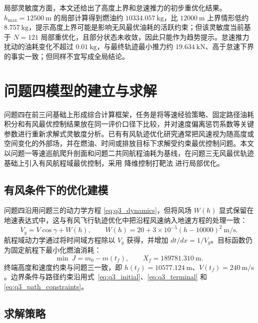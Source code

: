 \documentclass[withoutpreface,bwprint]{cumcmthesis}
\begin{document}
局部灵敏度方面，本文还给出了高度上界和怠速推力的初步重优化结果。$h_{\max}=12500\ \mathrm{m}$ 的局部计算得到燃油约 $10334.057\ \mathrm{kg}$，比 $12000\ \mathrm{m}$ 上界情形低约 $8.757\ \mathrm{kg}$，提示高度上界可能是影响无风最优油耗的活跃约束；但该灵敏度当前基于 $N=121$ 局部重优化，且部分状态未收敛，因此只能作为趋势提示。怠速推力扰动的油耗变化不超过 $0.01\ \mathrm{kg}$，与最终轨迹最小推力约 $19.634\ \mathrm{kN}$、高于怠速下界的事实一致；但同样不宜写成全局结论。

\section{问题四模型的建立与求解}

问题四在前三问基础上形成综合计算框架，任务是将等速经验策略、固定路径油耗积分和有风最优控制结果放在同一评价口径下比较，并对速度偏离惩罚系数等关键参数进行重新求解式灵敏度分析。已有有风轨迹优化研究通常把风速视为随高度或空间变化的外部场，并在燃油、时间或排放目标下求解受约束最优控制问题\cite{chang2023,jia2024}。本文以问题一等速巡航爬升剖面和问题二共同航程油耗为基线，在问题三无风最优轨迹基础上引入有风航程域最优控制，采用 降维控制打靶法 进行局部优化。

\subsection{有风条件下的优化建模}

问题四沿用问题三的动力学方程 \eqref{eq:q3_dynamics}，但将风场 $W(h)$ 显式保留在地速表达式中，这与有风飞行轨迹优化中把沿程风速纳入地速方程的处理一致\cite{chang2023,jia2024}：
\begin{equation}
V_g=V\cos\gamma+W(h),\qquad W(h)=20+3\times 10^{-5}(h-10000)^2\ \mathrm{m/s}.
\label{eq:q4_wind}
\end{equation}
航程域动力学通过将时间域方程除以 $V_g$ 获得，并增加 $dt/dx=1/V_g$。目标函数仍为固定航程下最小化燃油消耗：
\begin{equation}
\min\ J=m_0-m(t_f),\qquad X_f=189781.310\ \mathrm{m}.
\label{eq:q4_objective}
\end{equation}
终端高度和速度约束与问题三一致，即 $h(t_f)=10577.124\ \mathrm{m}$、$V(t_f)=240\ \mathrm{m/s}$。边界条件与路径约束沿用式~\eqref{eq:q3_initial}、\eqref{eq:q3_terminal} 和 \eqref{eq:q3_path_constraints}。

\subsection{求解策略}
\end{document}
